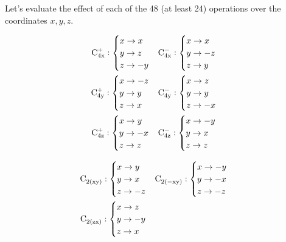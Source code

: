 Let's evaluate the effect of each of the 48 (at least 24) operations over the coordinates $x,y,z$.
%
\begin{minipage}[t]{0.45\linewidth}
\begin{align*}
  \ce{C^{+}_{4x}}:  \begin{cases} x \to x\\ y \to z\\ z \to -y \end{cases} &
  \ce{C^{-}_{4x}}:  \begin{cases} x \to x\\ y \to -z\\ z \to y \end{cases} \\
  \ce{C^{+}_{4y}}:  \begin{cases} x \to -z\\ y \to y\\ z \to x \end{cases} &
  \ce{C^{-}_{4y}}:  \begin{cases} x \to z\\ y \to y\\ z \to -x \end{cases} \\
  \ce{C^{+}_{4z}}:  \begin{cases} x \to y\\ y \to -x\\ z \to z \end{cases} &
  \ce{C^{-}_{4z}}:  \begin{cases} x \to -y\\ y \to x\\ z \to z \end{cases} \\
\end{align*}
\end{minipage}\hfill\begin{minipage}[t]{0.45\linewidth}
\begin{align*}
  \ce{C_{2(xy)}}:  \begin{cases} x \to y\\ y \to x\\ z \to -z \end{cases} &
  \ce{C_{2(-xy)}}:  \begin{cases} x \to -y\\ y \to -x\\ z \to -z \end{cases} \\
  \ce{C_{2(zx)}}:  \begin{cases} x \to z\\ y \to -y\\ z \to x \end{cases} &

\end{align*}
\end{minipage}
